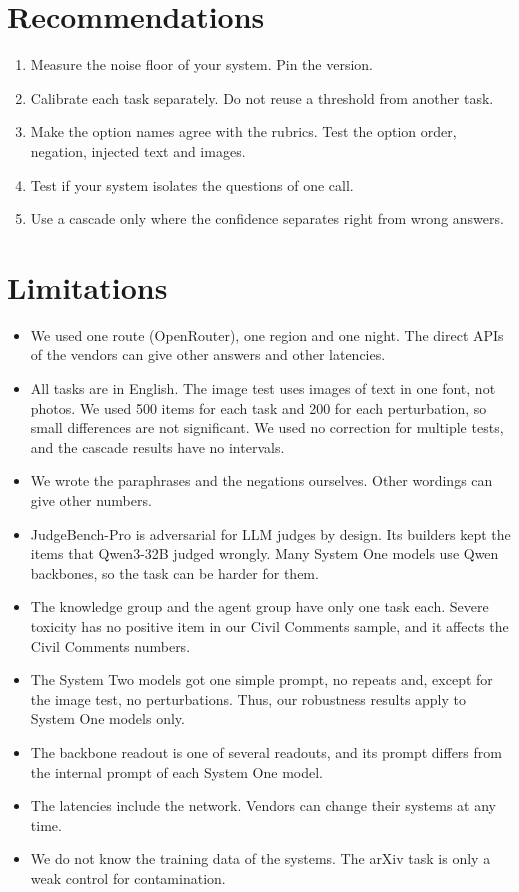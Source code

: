 \documentclass[11pt]{article}
\begin{document}
\section{Recommendations}

\begin{enumerate}
\setlength\itemsep{0pt}
\item Measure the noise floor of your system. Pin the version.
\item Calibrate each task separately. Do not reuse a threshold from another task.
\item Make the option names agree with the rubrics. Test the option order, negation, injected text and images.
\item Test if your system isolates the questions of one call.
\item Use a cascade only where the confidence separates right from wrong answers.
\end{enumerate}

\section*{Limitations}

\begin{itemize}
\setlength\itemsep{0pt}
\item We used one route (OpenRouter), one region and one night. The direct APIs of the vendors can give other answers and other latencies.
\item All tasks are in English. The image test uses images of text in one font, not photos. We used 500 items for each task and 200 for each perturbation, so small differences are not significant. We used no correction for multiple tests, and the cascade results have no intervals.
\item We wrote the paraphrases and the negations ourselves. Other wordings can give other numbers.
\item JudgeBench-Pro is adversarial for LLM judges by design. Its builders kept the items that Qwen3-32B judged wrongly. Many System One models use Qwen backbones, so the task can be harder for them.
\item The knowledge group and the agent group have only one task each. Severe toxicity has no positive item in our Civil Comments sample, and it affects the Civil Comments numbers.
\item The System Two models got one simple prompt, no repeats and, except for the image test, no perturbations. Thus, our robustness results apply to System One models only.
\item The backbone readout is one of several readouts, and its prompt differs from the internal prompt of each System One model.
\item The latencies include the network. Vendors can change their systems at any time.
\item We do not know the training data of the systems. The arXiv task is only a weak control for contamination.
\end{itemize}
\end{document}
